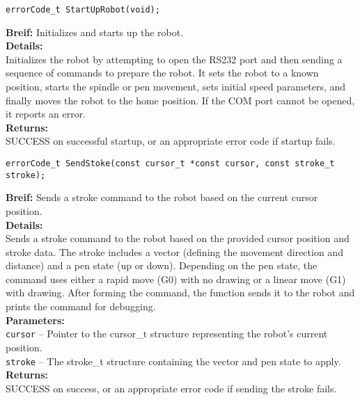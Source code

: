     
\begin{verbatim}
errorCode_t StartUpRobot(void);
\end{verbatim}
\textbf{Breif:} Initializes and starts up the robot. \\
\textbf{Details:} \\
\hspace*{1cm}Initializes the robot by attempting to open the RS232 port and then sending a sequence of commands to prepare the robot. It sets the robot to a known position, starts the spindle or pen movement, sets initial speed parameters, and finally moves the robot to the home position. If the COM port cannot be opened, it reports an error. \\
\textbf{Returns:} \\
\hspace*{1cm}SUCCESS on successful startup, or an appropriate error code if startup fails. \\[1em]

\begin{verbatim}
errorCode_t SendStoke(const cursor_t *const cursor, const stroke_t stroke);
\end{verbatim}
\textbf{Breif:} Sends a stroke command to the robot based on the current cursor position. \\
\textbf{Details:} \\
\hspace*{1cm}Sends a stroke command to the robot based on the provided cursor position and stroke data. The stroke includes a vector (defining the movement direction and distance) and a pen state (up or down). Depending on the pen state, the command uses either a rapid move (G0) with no drawing or a linear move (G1) with drawing. After forming the command, the function sends it to the robot and prints the command for debugging. \\
\textbf{Parameters:} \\
\hspace*{1cm}\texttt{cursor} -- Pointer to the cursor\_t structure representing the robot's current position. \\
\hspace*{1cm}\texttt{stroke} -- The stroke\_t structure containing the vector and pen state to apply. \\
\textbf{Returns:} \\
\hspace*{1cm}SUCCESS on success, or an appropriate error code if sending the stroke fails. \\[1em]

